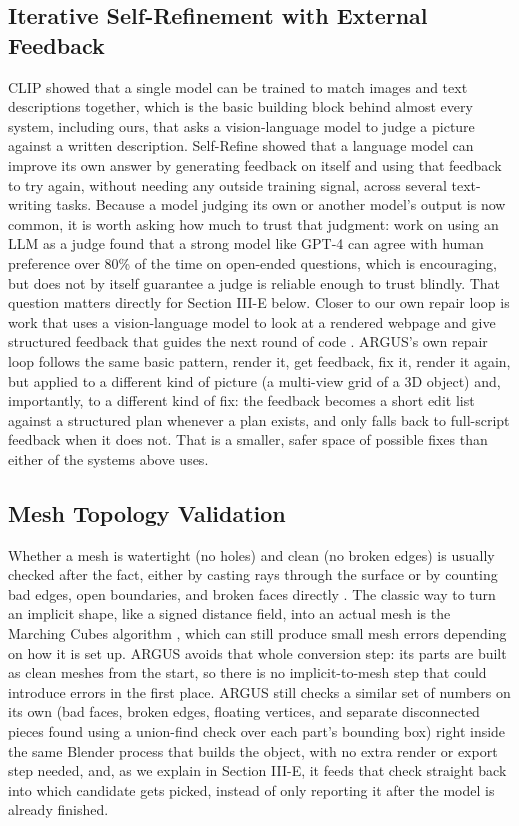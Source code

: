 \documentclass[conference]{IEEEtran}
\begin{document}
\subsection{Iterative Self-Refinement with External Feedback}
CLIP \cite{radford2021clip} showed that a single model can be trained to match images and text descriptions together, which is the basic building block behind almost every system, including ours, that asks a vision-language model to judge a picture against a written description. Self-Refine \cite{madaan2023selfrefine} showed that a language model can improve its own answer by generating feedback on itself and using that feedback to try again, without needing any outside training signal, across several text-writing tasks. Because a model judging its own or another model's output is now common, it is worth asking how much to trust that judgment: work on using an LLM as a judge \cite{zheng2023llmjudge} found that a strong model like GPT-4 can agree with human preference over 80\% of the time on open-ended questions, which is encouraging, but does not by itself guarantee a judge is reliable enough to trust blindly. That question matters directly for Section III-E below. Closer to our own repair loop is work that uses a vision-language model to look at a rendered webpage and give structured feedback that guides the next round of code \cite{visionguided2026}. ARGUS's own repair loop follows the same basic pattern, render it, get feedback, fix it, render it again, but applied to a different kind of picture (a multi-view grid of a 3D object) and, importantly, to a different kind of fix: the feedback becomes a short edit list against a structured plan whenever a plan exists, and only falls back to full-script feedback when it does not. That is a smaller, safer space of possible fixes than either of the systems above uses.

\subsection{Mesh Topology Validation}
Whether a mesh is watertight (no holes) and clean (no broken edges) is usually checked after the fact, either by casting rays through the surface or by counting bad edges, open boundaries, and broken faces directly \cite{huang2020manifoldplus}. The classic way to turn an implicit shape, like a signed distance field, into an actual mesh is the Marching Cubes algorithm \cite{lorensen1987marchingcubes}, which can still produce small mesh errors depending on how it is set up. ARGUS avoids that whole conversion step: its parts are built as clean meshes from the start, so there is no implicit-to-mesh step that could introduce errors in the first place. ARGUS still checks a similar set of numbers on its own (bad faces, broken edges, floating vertices, and separate disconnected pieces found using a union-find check over each part's bounding box) right inside the same Blender process that builds the object, with no extra render or export step needed, and, as we explain in Section III-E, it feeds that check straight back into which candidate gets picked, instead of only reporting it after the model is already finished.
\end{document}
